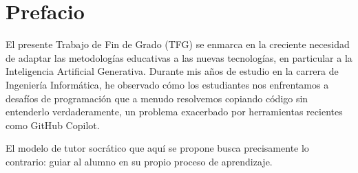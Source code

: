 \chapter*{Prefacio}
El presente Trabajo de Fin de Grado (TFG) se enmarca en la creciente necesidad de adaptar las metodologías educativas a las nuevas tecnologías, en particular a la Inteligencia Artificial Generativa. Durante mis años de estudio en la carrera de Ingeniería Informática, he observado cómo los estudiantes nos enfrentamos a desafíos de programación que a menudo resolvemos copiando código sin entenderlo verdaderamente, un problema exacerbado por herramientas recientes como GitHub Copilot. 

El modelo de tutor socrático que aquí se propone busca precisamente lo contrario: guiar al alumno en su propio proceso de aprendizaje.
